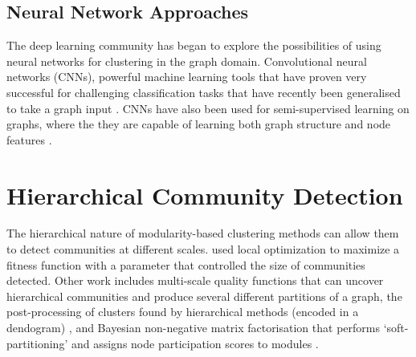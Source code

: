 \documentclass{report}
\begin{document}
	
	\subsection{Neural Network Approaches}
	The deep learning community has began to explore the possibilities of using neural networks for clustering in the graph domain. Convolutional neural networks (CNNs), powerful machine learning tools that have proven very successful for challenging classification tasks that have recently been generalised to take a graph input \cite{defferrard2016convolutional}. 
	CNNs have also been used for semi-supervised learning on graphs, where the they are capable of learning both graph structure and node features \cite{kipf2016semi}. 
	
	\section{Hierarchical Community Detection}
	
	The hierarchical nature of modularity-based clustering methods can allow them to detect communities at different scales. 
	\cite{lancichinetti2009detecting} used local optimization to maximize a fitness function with a parameter that controlled the size of communities detected.
	Other work includes multi-scale quality functions that can uncover hierarchical communities and produce several different partitions of a graph, the post-processing of clusters found by hierarchical methods (encoded in a dendogram) \cite{pons2011post}, and Bayesian non-negative matrix factorisation that performs `soft-partitioning' and assigns node participation scores to modules \cite{psorakis2011overlapping}.
	
\end{document}
